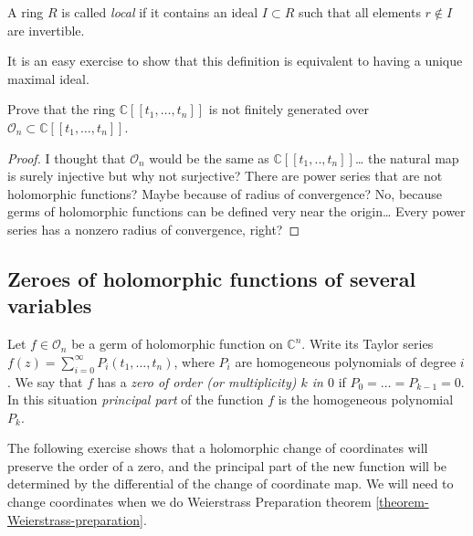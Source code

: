 \begin{definition}
\label{definition-local-ring}
A ring $R$ is called {\it local} if it contains an ideal $I\subset R$ such that
all elements $r \not \in I$ are invertible.
\end{definition}

It is an easy exercise to show that this definition is equivalent to having a
unique maximal ideal.

\begin{exercise}
\label{exercise-power-series-is-not-finitely-generated-over-stalk}
Prove that the ring $\mathbb{C}[\![ t_1,\ldots,t_n]\!]$ is not
finitely generated over $\mathcal{O}_n \subset 
\mathbb{C}[\![ t_1,\ldots,t_n]\!]$.
\end{exercise}

\begin{proof}
I thought that $\mathcal{O}_n$ would be the same as 
$\mathbb{C}[\![ t_1,..,t_n]\!]$… the natural map is surely injective
but why not surjective? There are power series that are not holomorphic
functions? Maybe because of radius of convergence? No, because germs of
holomorphic functions can be defined very near the origin… Every power series
has a nonzero radius of convergence, right?
\end{proof}

\subsection{Zeroes of holomorphic functions of several variables}
\label{subsection-zeroes-of-holomorphic-functions-of-several-variables}

\begin{definition}
\label{definition-zero-of-holomorphic-function-of-several-variables}
Let  $f\in \mathcal{O}_n$ be a germ of holomorphic function on $\mathbb{C}^n$.
Write its Taylor series $f(z)=\sum_{i=0}^\infty P_i(t_1,\ldots,t_n)$, where
$P_i$ are homogeneous polynomials of degree $i$. We say that $f$ has a {\it
zero of order (or multiplicity) $k$ in $0$} if $P_0=\ldots=P_{k-1}=0$. In this
situation {\it principal part} of the function $f$ is the homogeneous polynomial
$P_k$.
\end{definition}

The following exercise shows that a holomorphic change of coordinates will
preserve the order of a zero, and the principal part of the new function will be
determined by the differential of the change of coordinate map. We will need to
change coordinates when we do Weierstrass Preparation theorem
\ref{theorem-Weierstrass-preparation}.

